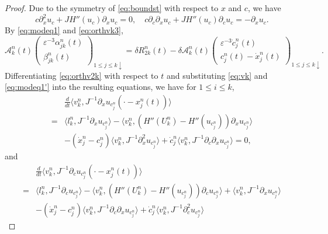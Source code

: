 \documentclass[11pt]{amsart}
\theoremstyle{remark}
\numberwithin{equation}{section}
\begin{document}
\begin{proof}
Due to the symmetry of \eqref{eq:boundst} with respect to $x$ and $c$,
we have
\begin{equation}
  \label{eq:secularmode}
c{\partial}_x^2u_{c}+JH''(u_{c}){\partial}_xu_{c}=0,\quad
c{\partial}_c{\partial}_xu_{c}+JH''(u_{c}){\partial}_cu_{c}=-{\partial}_xu_c.
\end{equation}
By \eqref{eq:modeq1} and \eqref{eq:orthvk3},
\begin{equation}
  \label{eq:modeq1'}
\mathcal{A}_k^n(t)\begin{pmatrix}
{\varepsilon}^{-3}\alpha_{jk}^n(t)\\\beta_{jk}^n(t)
\end{pmatrix}_{1\le j\le k\downarrow}
=\delta R_{2k}^n(t)-\delta\mathcal{A}_k^n(t)
\begin{pmatrix}
{\varepsilon}^{-3}\dot{c}_j^n(t)\\ c_j^n(t)-\dot{x}_j^n(t)
\end{pmatrix}_{1\le j\le k\downarrow}.  
\end{equation}
Differentiating \eqref{eq:orthv2k} with respect to $t$ and substituting
\eqref{eq:vk} and \eqref{eq:modeq1'} into the resulting equations,
we have for $1\le i\le k$, 
\begin{equation}
  \label{eq:modeqa}
  \begin{split}
&  \frac{d}{dt}{\langle} v_k^n,J^{-1}{\partial}_xu_{c_j^n}(\cdot-x_j^n(t)){\rangle}
\\=&
{\langle} l_k^n, J^{-1}{\partial}_xu_{c_j^n}{\rangle}
-{\langle} v_k^n,(H''(U_k^n)-H''(u_{c_j^n})){\partial}_xu_{c_j^n}{\rangle} \\ &
-(\dot{x}_j^n-c_j^n){\langle} v_k^n,J^{-1}{\partial}_x^2u_{c_j^n}{\rangle}
+\dot{c}_j^n{\langle} v_k^n,J^{-1}{\partial}_c{\partial}_xu_{c_j^n}{\rangle}=0,    
  \end{split}
\end{equation}
and
\begin{equation}
  \label{eq:modeqb}
  \begin{split}
&  \frac{d}{dt}{\langle} v_k^n,J^{-1}{\partial}_cu_{c_j^n}(\cdot-x_j^n(t)){\rangle}
\\=&
{\langle} l_k^n, J^{-1}{\partial}_cu_{c_j^n}{\rangle}
-{\langle} v_k^n,(H''(U_k^n)-H''(u_{c_j^n})){\partial}_cu_{c_j^n}{\rangle}
+{\langle} v_k^n,J^{-1}{\partial}_xu_{c_j^n}{\rangle}
\\ &
-(\dot{x}_j^n-c_j^n){\langle} v_k^n,J^{-1}{\partial}_c{\partial}_xu_{c_j^n}{\rangle}
+\dot{c}_j^n{\langle} v_k^n,J^{-1}{\partial}_c^2u_{c_j^n}{\rangle}

\end{split}
\end{equation}
\end{proof}
\end{document}
